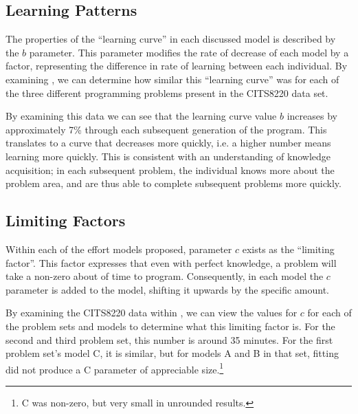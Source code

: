 \documentclass[a4paper,10pt]{article}
\begin{document}
\subsection{Learning Patterns}
The properties of the ``learning curve'' in each discussed model is described by the $b$ parameter. This parameter modifies the rate of decrease of each model by a factor, representing the difference in rate of learning between each individual. By examining , we can determine how similar this ``learning curve'' was for each of the three different programming problems present in the CITS8220 data set.

By examining this data we can see that the learning curve value $b$ increases by approximately 7\% through each subsequent generation of the program. This translates to a curve that decreases more quickly, i.e. a higher number means learning more quickly. This is consistent with an understanding of knowledge acquisition; in each subsequent problem, the individual knows more about the problem area, and are thus able to complete subsequent problems more quickly.

\subsection{Limiting Factors}
Within each of the effort models proposed, parameter $c$ exists as the ``limiting factor''. This factor expresses that even with perfect knowledge, a problem will take a non-zero about of time to program. Consequently, in each model the $c$ parameter is added to the model, shifting it upwards by the specific amount.

By examining the CITS8220 data within , we can view the values for $c$ for each of the problem sets and models to determine what this limiting factor is. For the second and third problem set, this number is around 35 minutes. For the first problem set's model C, it is similar, but for models A and B in that set, fitting did not produce a C parameter of appreciable size.\footnote{C was non-zero, but very small in unrounded results.}
\end{document}
